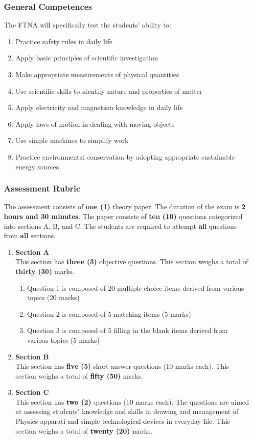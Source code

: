 \subsubsection{General Competences}
\noindent The FTNA will specifically test the students' ability to:
\begin{enumerate}[topsep=1ex,itemsep=0ex,partopsep=1ex,parsep=1ex]
	\item Practice safety rules in daily life
	\item Apply basic principles of scientific investigation
	\item Make appropriate measurements of physical quantities
	\item Use scientific skills to identify nature and properties of matter
	\item Apply electricity and magnetism knowledge in daily life
	\item Apply laws of motion in dealing with moving objects
	\item Use simple machines to simplify work
	\item Practice environmental conservation by adopting appropriate sustainable energy sources
\end{enumerate}

\subsubsection{Assessment Rubric}
\noindent The assessment consists of \textbf{one (1)} theory paper. The duration of the exam is \textbf{2 hours and 30 minutes}. The paper consists of \textbf{ten (10)} questions categorized into sections A, B, and C. The students are required to attempt \textbf{all} questions from \textbf{all} sections. 
\begin{enumerate}
	\item \textbf{Section A} \\
	This section has \textbf{three (3)} objective questions. This section weighs a total of \textbf{thirty (30)} marks.
	\begin{enumerate}
		\item Question 1 is composed of 20 multiple choice items derived from various topics (20 marks)
		\item Question 2 is composed of 5 matching items (5 marks)
		\item Question 3 is composed of 5 filling in the blank items derived from various topics (5 marks)
	\end{enumerate}
	
	\item \textbf{Section B} \\
	This section has \textbf{five (5)} short answer questions (10 marks each). This section weighs a total of \textbf{fifty (50)} marks.
	
	\item \textbf{Section C} \\
	This section has \textbf{two (2)} questions (10 marks each). The questions are aimed at assessing students' knowledge and skills in drawing and management of Physics apparati and simple technological devices in everyday life. This section weighs a total of \textbf{twenty (20)} marks. 
\end{enumerate}

